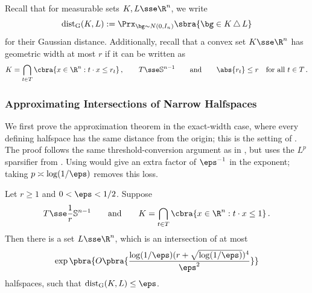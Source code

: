\documentclass[11pt]{article}
\renewcommand{\S}{\mathbb{S}}
\newcommand{\dG}{\mathrm{dist}_{\mathrm{G}}}
\begin{document}
Recall that for measurable sets $K,L\sse\R^n$, we write
\[
	\dG(K,L)
	:=
	\Prx_{\bg\sim N(0,I_n)}
	\sbra{\bg\in K\,\triangle\,L}
\]
for their Gaussian distance.
Additionally, recall that a convex set $K\sse\R^n$ has geometric width at most $r$ if it can be written as
\[
	K
	=
	\bigcap_{t\in T}
	\cbra{x\in\R^n:t\cdot x\leq r_t}\,,
	\qquad
	T\sse\S^{n-1}
	\qquad\text{and}\qquad
	\abs{r_t}\leq r
	\quad\text{for all }t\in T\,.
\]

\subsubsection{Approximating Intersections of Narrow Halfspaces}

We first prove the approximation theorem in the exact-width case, where every defining halfspace has the same distance from the origin; this is the setting of \cite[Lemma~28]{de2026sparsifying}. 
The proof follows the same threshold-conversion argument as in \cite{de2026sparsifying}, but uses the $L^p$ sparsifier from . 
Using  would give an extra factor of $\eps^{-1}$ in the exponent; taking $p\asymp\log(1/\eps)$ removes this loss. 

\begin{lemma}
	\label{lem:exact-width-polytope}
	Let $r\geq1$ and $0<\eps<1/2$.
	Suppose
	\[
		T\sse \frac1r \S^{n-1}
		\qquad\text{and}\qquad
		K=
		\bigcap_{t\in T}
		\cbra{x\in\R^n:t\cdot x\leq 1}\,.
	\]
	Then there is a set $L\sse\R^n$, which is an intersection of at most
	\[
		\exp\pbra{
			O\pbra{
				\frac{\log(1/\eps)(r+\sqrt{\log(1/\eps)})^4}{\eps^2}
			}
		}
	\]
	halfspaces, such that $\dG(K,L)\leq\eps$.
\end{lemma}
\end{document}
